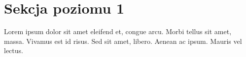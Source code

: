 \section{Sekcja poziomu 1}%
Lorem ipsum dolor sit amet eleifend et, congue arcu. Morbi tellus sit amet, massa. Vivamus est id risus. Sed sit amet, libero. Aenean ac ipsum. Mauris vel lectus. 


